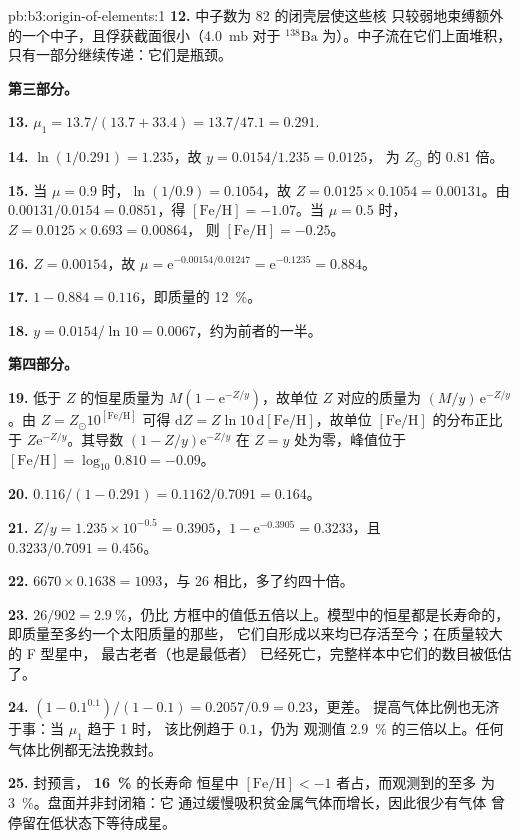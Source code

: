 \begin{solution}{pb:b3:origin-of-elements:1}
\textbf{12.} 中子数为 82 的闭壳层使这些核
只较弱地束缚额外的一个中子，且俘获截面很小（\qty{4.0}{mb}
对于 $^{138}\mathrm{Ba}$ 为）。中子流在它们上面堆积，
只有一部分继续传递：它们是瓶颈。

\textbf{第三部分。}

\textbf{13.} $\mu_1 = 13.7/(13.7 + 33.4) = 13.7/47.1 = \num{0.291}$.

\textbf{14.} $\ln(1/0.291) = \num{1.235}$，故 $y = 0.0154/1.235 = \num{0.0125}$，
为 $Z_\odot$ 的 \num{0.81} 倍。

\textbf{15.} 当 $\mu = 0.9$ 时，$\ln(1/0.9) = 0.1054$，故 $Z = 0.0125\times0.1054 =
\num{0.00131}$。由 $0.00131/0.0154 = 0.0851$，得 $[\mathrm{Fe/H}] =
-1.07$。当 $\mu = 0.5$ 时，$Z = 0.0125\times0.693 = \num{0.00864}$，
则 $[\mathrm{Fe/H}] = -0.25$。

\textbf{16.} $Z = 0.00154$，故 $\mu = \mathrm{e}^{-0.00154/0.01247} =
\mathrm{e}^{-0.1235} = \num{0.884}$。

\textbf{17.} $1 - 0.884 = \num{0.116}$，即质量的 \qty{12}{\percent}。

\textbf{18.} $y = 0.0154/\ln 10 = \num{0.0067}$，约为前者的一半。

\textbf{第四部分。}

\textbf{19.} 低于 $Z$ 的恒星质量为
$M(1 - \mathrm{e}^{-Z/y})$，故单位 $Z$ 对应的质量为
$(M/y)\,\mathrm{e}^{-Z/y}$。由 $Z = Z_\odot10^{[\mathrm{Fe/H}]}$ 可得
$\mathrm{d}Z = Z\ln 10\,\mathrm{d}[\mathrm{Fe/H}]$，故单位
$[\mathrm{Fe/H}]$ 的分布正比于
$Z\mathrm{e}^{-Z/y}$。其导数
$(1 - Z/y)\mathrm{e}^{-Z/y}$ 在 $Z = y$ 处为零，峰值位于
$[\mathrm{Fe/H}] = \log_{10}0.810 = -0.09$。

\textbf{20.} $\num{0.116}/(1 - 0.291) = 0.1162/0.7091 = \num{0.164}$。

\textbf{21.} $Z/y = 1.235\times10^{-0.5} = 0.3905$，$1 - \mathrm{e}^{-0.3905} =
0.3233$，且 $0.3233/0.7091 = \num{0.456}$。

\textbf{22.} $6670\times0.1638 = 1093$，与 26 相比，多了约四十倍。

\textbf{23.} $26/902 = \qty{2.9}{\percent}$，仍比
方框中的值低五倍以上。模型中的恒星都是长寿命的，即质量至多约一个太阳质量的那些，
它们自形成以来均已存活至今；在质量较大的 F 型星中，
最古老者（也是最低者）
已经死亡，完整样本中它们的数目被低估了。

\textbf{24.} $(1 - 0.1^{0.1})/(1 - 0.1) = 0.2057/0.9 = \num{0.23}$，更差。
提高气体比例也无济于事：当 $\mu_1$ 趋于 1 时，
该比例趋于 $0.1$，仍为
观测值 \qty{2.9}{\percent} 的三倍以上。任何气体比例都无法挽救封。

\textbf{25.} 封预言，
\textbf{\qty[text-series-to-math=true]{16}{\percent}} 的长寿命
恒星中 $[\mathrm{Fe/H}] < -1$ 者占，而观测到的至多
为 \qty{3}{\percent}。盘面并非封闭箱：它
通过缓慢吸积贫金属气体而增长，因此很少有气体
曾停留在低状态下等待成星。
\end{solution}
